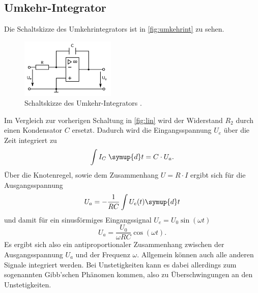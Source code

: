 \subsection{Umkehr-Integrator}
Die Schaltskizze des Umkehrintegrators ist in \autoref{fig:umkehrint} zu sehen.
\begin{figure}[H]
    \centering
    \includegraphics[width=0.4\textwidth]{integrator.png}
    \caption{Schaltskizze des Umkehr-Integrators \cite{anleitung}.}
    \label{fig:umkehrint}
\end{figure}
Im Vergleich zur vorherigen Schaltung in \autoref{fig:lin} wird der Widerstand $R_2$ durch einen
Kondensator $C$ ersetzt.
Dadurch wird die Eingangsspannung $U_e$ über die Zeit integriert zu
\begin{equation*}
    \int I_C \; \symup{d} t = C \cdot U_a.
\end{equation*}
Über die Knotenregel, sowie dem Zusammenhang $U = R \cdot I$ ergibt sich für die Ausgangsspannung
\begin{equation*}
    U_a = - \frac{1}{RC} \int U_e (t) \symup{d} t
\end{equation*}
und damit für ein sinusförmiges Eingangssignal $U_e = U_0 \sin(\omega t)$
\begin{equation*}
    U_a = \frac{U_0}{\omega R C} \cos(\omega t).
\end{equation*}
Es ergibt sich also ein antiproportionaler Zusammenhang zwischen der Ausgangsspannung $U_a$
und der Frequenz $\omega$. Allgemein können auch alle anderen Signale integriert werden.
Bei Unstetigkeiten kann es dabei allerdings zum sogenannten Gibb'schen Phänomen kommen,
also zu Überschwingungen an den Unstetigkeiten.

